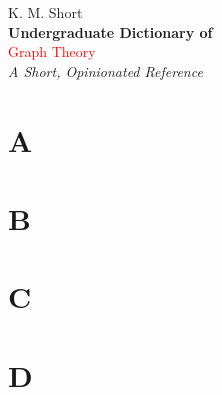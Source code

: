 \documentclass[10pt,a4paper,twoside]{article}
\newcommand{\entry}[4]{\markboth{#1}{#1}\textbf{#1}\ {(#2)}\ \textit{#3}\ $\bullet$\ {#4}}  %
\newcommand*{\plogo}{\fbox{$\mathcal{K!}$}} %
\newcommand*{\titleTH}{\begingroup %
\raggedleft %
\vspace*{\baselineskip} %

{\Large K. M. Short}\\[0.167\textheight] %

{\LARGE\bfseries Undergraduate Dictionary of}\\[\baselineskip] %

{\textcolor{Red}{\Huge Graph Theory}}\\[\baselineskip] %

{\Large \textit{A Short, Opinionated Reference}}\par %

\vfill %

{\large \plogo}\par %

\vspace*{3\baselineskip} %
\endgroup}
\begin{document}
\pagestyle{empty} %

\titleTH

\pagebreak


\section*{A}

\begin{multicols}{2}


\end{multicols}


\section*{B}

\begin{multicols}{2}


\end{multicols}


\section*{C}

\begin{multicols}{2}


\end{multicols}


\section*{D}
\end{document}
